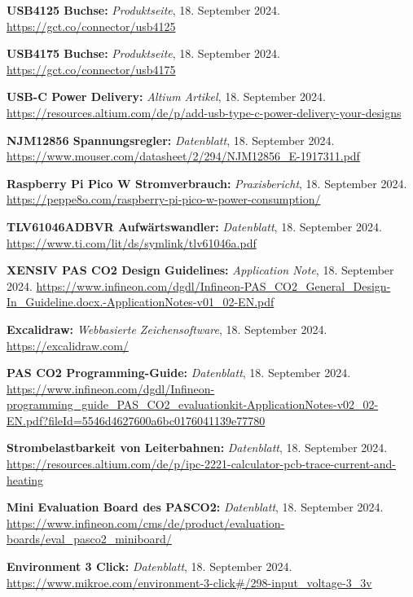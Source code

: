 \begin{thebibliography}{9999}
\textbf{USB4125 Buchse:} \textit{Produktseite}, 18. September 2024.  
\url{https://gct.co/connector/usb4125}

\textbf{USB4175 Buchse:} \textit{Produktseite}, 18. September 2024.  
\url{https://gct.co/connector/usb4175}

\textbf{USB-C Power Delivery:} \textit{Altium Artikel}, 18. September 2024.  
\url{https://resources.altium.com/de/p/add-usb-type-c-power-delivery-your-designs}

\textbf{NJM12856 Spannungsregler:} \textit{Datenblatt}, 18. September 2024.  
\url{https://www.mouser.com/datasheet/2/294/NJM12856_E-1917311.pdf}

\textbf{Raspberry Pi Pico W Stromverbrauch:} \textit{Praxisbericht}, 18. September 2024.  
\url{https://peppe8o.com/raspberry-pi-pico-w-power-consumption/}

\textbf{TLV61046ADBVR Aufwärtswandler:} \textit{Datenblatt}, 18. September 2024.  
\url{https://www.ti.com/lit/ds/symlink/tlv61046a.pdf}

\textbf{XENSIV PAS CO2 Design Guidelines:} \textit{Application Note}, 18. September 2024.  
\url{https://www.infineon.com/dgdl/Infineon-PAS_CO2_General_Design-In_Guideline.docx.-ApplicationNotes-v01_02-EN.pdf}

\textbf{Excalidraw:} \textit{Webbasierte Zeichensoftware}, 18. September 2024.  
\url{https://excalidraw.com/}

\textbf{PAS CO2 Programming-Guide:} \textit{Datenblatt}, 18. September 2024.  
\url{https://www.infineon.com/dgdl/Infineon-programming_guide_PAS_CO2_evaluationkit-ApplicationNotes-v02_02-EN.pdf?fileId=5546d4627600a6bc0176041139e77780}

\textbf{Strombelastbarkeit von Leiterbahnen:} \textit{Datenblatt}, 18. September 2024.  
\url{https://resources.altium.com/de/p/ipc-2221-calculator-pcb-trace-current-and-heating}

\textbf{Mini Evaluation Board des PASCO2:} \textit{Datenblatt}, 18. September 2024.  
\url{https://www.infineon.com/cms/de/product/evaluation-boards/eval_pasco2_miniboard/}

\textbf{Environment 3 Click:} \textit{Datenblatt}, 18. September 2024.  
\url{https://www.mikroe.com/environment-3-click#/298-input_voltage-3_3v}





\end{thebibliography}
